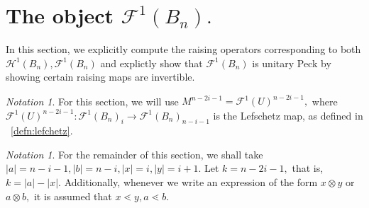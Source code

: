 \documentclass{amsart}
\theoremstyle{remark}
\newtheorem{note}[thm]{Notation}
\begin{document}
\section{The object $\mathcal F^1(B_n).$}
\label{sec:unitary_peck_f}
In this section, we explicitly compute the raising operators corresponding to both $\mathcal H^1(B_n),\mathcal F^1(B_n)$ and explictly show that $\mathcal F^1(B_n)$ is unitary Peck by showing certain raising maps are invertible.

\begin{note}
For this section, we will use $M^{n-2i-1} = \mathcal F^1(U)^{n-2i-1},$ where $\mathcal F^1(U)^{n-2i-1}:\mathcal F^1(B_n)_i \rightarrow \mathcal F^1(B_n)_{n-i-1}$ is the Lefschetz map, as defined in ~\ref{defn:lefchetz}.
\end{note}
\begin{note}
For the remainder of this section, we shall take $|a| = n-i-1,|b|= n-i,|x| = i,|y| = i+1.$ Let $k = n-2i-1,$ that is, $k = |a| - |x|.$ Additionally, whenever we write an expression of the form $x \otimes y$ or $a \otimes b,$ it is assumed that $x \lessdot y,a \lessdot b.$
\end{note}
\end{document}
